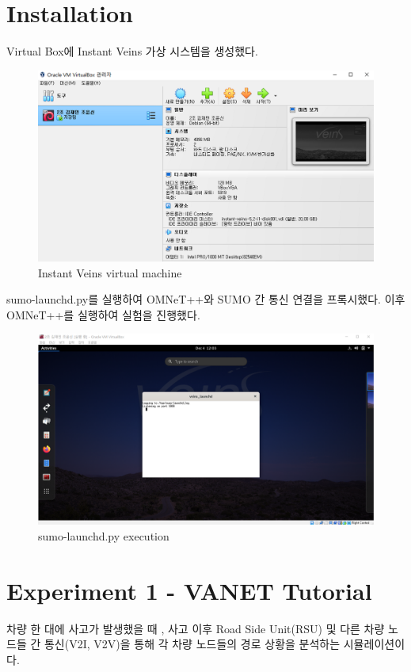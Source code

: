 \vspace{-6mm}
\section*{Installation}
    Virtual Box에 Instant Veins 가상 시스템을 생성했다.
    \begin{figure}[!h]\centering 
        \includegraphics[width=.68\textwidth]{image/week13/0-1.png}
        \caption{\footnotesize
        Instant Veins virtual machine}
        \vspace{-10pt}
    \end{figure}
    
    sumo-launchd.py를 실행하여 OMNeT++와 SUMO 간 통신 연결을 프록시했다. 이후 OMNeT++를 실행하여 실험을 진행했다.
    \begin{figure}[!h]\centering 
        \includegraphics[width=.68\textwidth]{image/week13/0-2.png}
        \caption{\footnotesize
        sumo-launchd.py execution}
        \vspace{-10pt}
    \end{figure}
\newpage
    
    
\section*{Experiment 1 - VANET Tutorial}
    차량 한 대에 사고가 발생했을 때 , 사고 이후 Road Side Unit(RSU) 및 다른 차량 노드들 간 통신(V2I, V2V)을 통해 각 차량 노드들의 경로 상황을 분석하는 시뮬레이션이다. 
    
